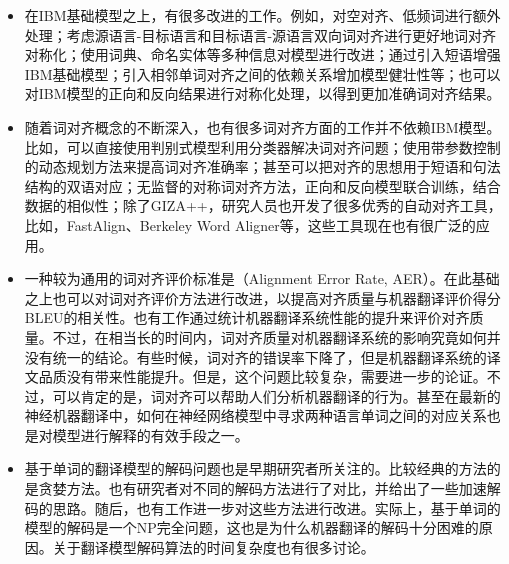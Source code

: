 \begin{itemize}
\vspace{0.5em}
\item 在IBM基础模型之上，有很多改进的工作。例如，对空对齐、低频词进行额外处理；考虑源语言-目标语言和目标语言-源语言双向词对齐进行更好地词对齐对称化；使用词典、命名实体等多种信息对模型进行改进；通过引入短语增强IBM基础模型；引入相邻单词对齐之间的依赖关系增加模型健壮性等；也可以对IBM模型的正向和反向结果进行对称化处理，以得到更加准确词对齐结果。

\item 随着词对齐概念的不断深入，也有很多词对齐方面的工作并不依赖IBM模型。比如，可以直接使用判别式模型利用分类器解决词对齐问题；使用带参数控制的动态规划方法来提高词对齐准确率；甚至可以把对齐的思想用于短语和句法结构的双语对应；无监督的对称词对齐方法，正向和反向模型联合训练，结合数据的相似性；除了GIZA++，研究人员也开发了很多优秀的自动对齐工具，比如，FastAlign、Berkeley Word Aligner等，这些工具现在也有很广泛的应用。

\vspace{0.5em}
\item 一种较为通用的词对齐评价标准是{}（Alignment Error Rate, AER）。在此基础之上也可以对词对齐评价方法进行改进，以提高对齐质量与机器翻译评价得分BLEU的相关性。也有工作通过统计机器翻译系统性能的提升来评价对齐质量。不过，在相当长的时间内，词对齐质量对机器翻译系统的影响究竟如何并没有统一的结论。有些时候，词对齐的错误率下降了，但是机器翻译系统的译文品质没有带来性能提升。但是，这个问题比较复杂，需要进一步的论证。不过，可以肯定的是，词对齐可以帮助人们分析机器翻译的行为。甚至在最新的神经机器翻译中，如何在神经网络模型中寻求两种语言单词之间的对应关系也是对模型进行解释的有效手段之一。

\vspace{0.5em}
\item 基于单词的翻译模型的解码问题也是早期研究者所关注的。比较经典的方法的是贪婪方法。也有研究者对不同的解码方法进行了对比，并给出了一些加速解码的思路。随后，也有工作进一步对这些方法进行改进。实际上，基于单词的模型的解码是一个NP完全问题，这也是为什么机器翻译的解码十分困难的原因。关于翻译模型解码算法的时间复杂度也有很多讨论。
\end{itemize}
